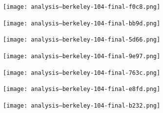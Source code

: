 \texttt{[image: analysis--berkeley-104-final-f0c8.png]}



\texttt{[image: analysis--berkeley-104-final-bb9d.png]}







\texttt{[image: analysis--berkeley-104-final-5d66.png]}



\texttt{[image: analysis--berkeley-104-final-9e97.png]}





\texttt{[image: analysis--berkeley-104-final-763c.png]}



\texttt{[image: analysis--berkeley-104-final-e8fd.png]}





\texttt{[image: analysis--berkeley-104-final-b232.png]}
